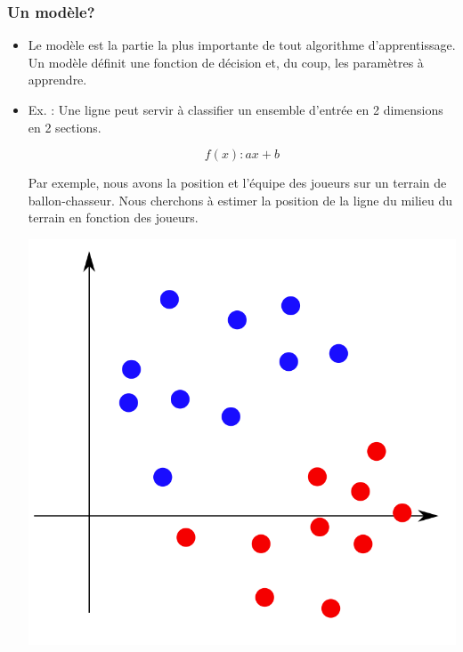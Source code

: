 \documentclass[french]{beamer}
\begin{document}
\begin{frame}
\frametitle{Un modèle?}
\begin{itemize}
\item Le modèle est la partie la plus importante de tout algorithme d'apprentissage. Un modèle définit une fonction de décision et, du coup, les paramètres à apprendre.
\pause
\item Ex. : Une ligne peut servir à classifier un ensemble d'entrée en 2 dimensions en 2 sections. 

	$$f(x): ax + b$$

\pause
Par exemple, nous avons la position et l'équipe des joueurs sur un terrain de ballon-chasseur. Nous cherchons à estimer la position de la ligne du milieu du terrain en fonction des joueurs.
\begin{center}
\includegraphics[scale=0.2]{ballon-chasseur.png}
\end{center}

\end{itemize}

\end{frame}
\end{document}
